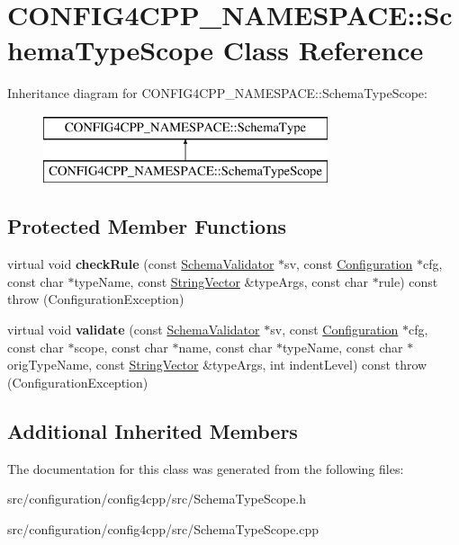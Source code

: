 \hypertarget{classCONFIG4CPP__NAMESPACE_1_1SchemaTypeScope}{\section{C\-O\-N\-F\-I\-G4\-C\-P\-P\-\_\-\-N\-A\-M\-E\-S\-P\-A\-C\-E\-:\-:Schema\-Type\-Scope Class Reference}
\label{classCONFIG4CPP__NAMESPACE_1_1SchemaTypeScope}
}
Inheritance diagram for C\-O\-N\-F\-I\-G4\-C\-P\-P\-\_\-\-N\-A\-M\-E\-S\-P\-A\-C\-E\-:\-:Schema\-Type\-Scope\-:\begin{figure}[H]
\begin{center}
\leavevmode
\includegraphics[height=2.000000cm]{classCONFIG4CPP__NAMESPACE_1_1SchemaTypeScope}
\end{center}
\end{figure}
\subsection*{Protected Member Functions}
\begin{DoxyCompactItemize}
\item 
\hypertarget{classCONFIG4CPP__NAMESPACE_1_1SchemaTypeScope_af6e7876220705a31af236fa1b483e0e3}{virtual void {\bfseries check\-Rule} (const \hyperlink{classCONFIG4CPP__NAMESPACE_1_1SchemaValidator}{Schema\-Validator} $\ast$sv, const \hyperlink{classCONFIG4CPP__NAMESPACE_1_1Configuration}{Configuration} $\ast$cfg, const char $\ast$type\-Name, const \hyperlink{classCONFIG4CPP__NAMESPACE_1_1StringVector}{String\-Vector} \&type\-Args, const char $\ast$rule) const   throw (\-Configuration\-Exception)}\label{classCONFIG4CPP__NAMESPACE_1_1SchemaTypeScope_af6e7876220705a31af236fa1b483e0e3}

\item 
\hypertarget{classCONFIG4CPP__NAMESPACE_1_1SchemaTypeScope_af41e7e93aabf7a26b225b75e2c10db7f}{virtual void {\bfseries validate} (const \hyperlink{classCONFIG4CPP__NAMESPACE_1_1SchemaValidator}{Schema\-Validator} $\ast$sv, const \hyperlink{classCONFIG4CPP__NAMESPACE_1_1Configuration}{Configuration} $\ast$cfg, const char $\ast$scope, const char $\ast$name, const char $\ast$type\-Name, const char $\ast$orig\-Type\-Name, const \hyperlink{classCONFIG4CPP__NAMESPACE_1_1StringVector}{String\-Vector} \&type\-Args, int indent\-Level) const   throw (\-Configuration\-Exception)}\label{classCONFIG4CPP__NAMESPACE_1_1SchemaTypeScope_af41e7e93aabf7a26b225b75e2c10db7f}

\end{DoxyCompactItemize}
\subsection*{Additional Inherited Members}


The documentation for this class was generated from the following files\-:\begin{DoxyCompactItemize}
\item 
src/configuration/config4cpp/src/Schema\-Type\-Scope.\-h\item 
src/configuration/config4cpp/src/Schema\-Type\-Scope.\-cpp\end{DoxyCompactItemize}
